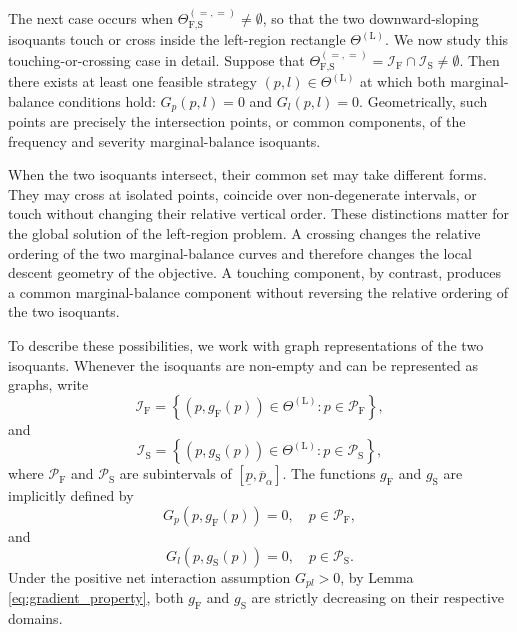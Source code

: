 \documentclass[a4paper,12pt]{article}
\begin{document}
The next case occurs when $\Theta_{\text{F,S}}^{\left(=,=\right)}\neq\emptyset$, so that the two downward-sloping isoquants touch or cross inside the left-region rectangle $\Theta^{\left(\text{L}\right)}$. We now study this touching-or-crossing case in detail. Suppose that $\Theta_{\text{F,S}}^{\left(=,=\right)}=\mathcal{I}_{\text{F}}\cap\mathcal{I}_{\text{S}}\neq\emptyset$. Then there exists at least one feasible strategy $\left(p,l\right)\in\Theta^{\left(\text{L}\right)}$ at which both marginal-balance conditions hold: $G_p\left(p,l\right)=0$ and $G_l\left(p,l\right)=0$. Geometrically, such points are precisely the intersection points, or common components, of the frequency and severity marginal-balance isoquants.

When the two isoquants intersect, their common set may take different forms. They may cross at isolated points, coincide over non-degenerate intervals, or touch without changing their relative vertical order. These distinctions matter for the global solution of the left-region problem. A crossing changes the relative ordering of the two marginal-balance curves and therefore changes the local descent geometry of the objective. A touching component, by contrast, produces a common marginal-balance component without reversing the relative ordering of the two isoquants.

To describe these possibilities, we work with graph representations of the two isoquants. Whenever the isoquants are non-empty and can be represented as graphs, write
\begin{equation*}
\mathcal{I}_{\text{F}}=\left\{\left(p,g_{\text{F}}\left(p\right)\right)\in\Theta^{\left(\text{L}\right)}:p\in\mathcal{P}_{\text{F}}\right\},
\end{equation*}
and
\begin{equation*}
\mathcal{I}_{\text{S}}=\left\{\left(p,g_{\text{S}}\left(p\right)\right)\in\Theta^{\left(\text{L}\right)}:p\in\mathcal{P}_{\text{S}}\right\},
\end{equation*}
where $\mathcal{P}_{\text{F}}$ and $\mathcal{P}_{\text{S}}$ are subintervals of $\left[\underline{p},\overline{p}_{\alpha}\right]$. The functions $g_{\text{F}}$ and $g_{\text{S}}$ are implicitly defined by
\begin{equation*}
G_p\left(p,g_{\text{F}}\left(p\right)\right)=0,\quad p\in\mathcal{P}_{\text{F}},
\end{equation*}
and
\begin{equation*}
G_l\left(p,g_{\text{S}}\left(p\right)\right)=0,\quad p\in\mathcal{P}_{\text{S}}.
\end{equation*}
Under the positive net interaction assumption $G_{pl}>0$, by Lemma \ref{eq:gradient_property}, both $g_{\text{F}}$ and $g_{\text{S}}$ are strictly decreasing on their respective domains.
\end{document}
